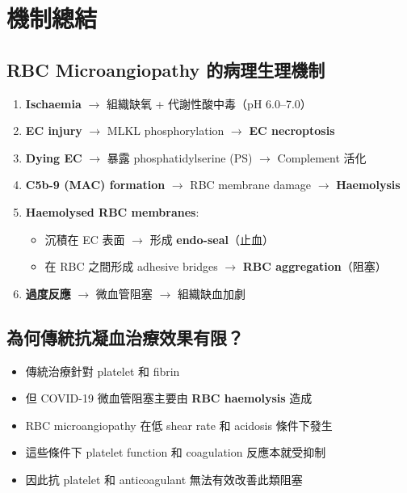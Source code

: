 \documentclass[12pt,a4paper]{article}
\begin{document}

\section{機制總結}

\subsection{RBC Microangiopathy 的病理生理機制}

\begin{enumerate}
    \item \textbf{Ischaemia} $\rightarrow$ 組織缺氧 + 代謝性酸中毒（pH 6.0--7.0）
    \item \textbf{EC injury} $\rightarrow$ MLKL phosphorylation $\rightarrow$ \textbf{EC necroptosis}
    \item \textbf{Dying EC} $\rightarrow$ 暴露 phosphatidylserine (PS) $\rightarrow$ Complement 活化
    \item \textbf{C5b-9 (MAC) formation} $\rightarrow$ RBC membrane damage $\rightarrow$ \textbf{Haemolysis}
    \item \textbf{Haemolysed RBC membranes}:
    \begin{itemize}
        \item 沉積在 EC 表面 $\rightarrow$ 形成 \textbf{endo-seal}（止血）
        \item 在 RBC 之間形成 adhesive bridges $\rightarrow$ \textbf{RBC aggregation}（阻塞）
    \end{itemize}
    \item \textbf{過度反應} $\rightarrow$ 微血管阻塞 $\rightarrow$ 組織缺血加劇
\end{enumerate}

\subsection{為何傳統抗凝血治療效果有限？}

\begin{itemize}
    \item 傳統治療針對 platelet 和 fibrin
    \item 但 COVID-19 微血管阻塞主要由 \textbf{RBC haemolysis} 造成
    \item RBC microangiopathy 在低 shear rate 和 acidosis 條件下發生
    \item 這些條件下 platelet function 和 coagulation 反應本就受抑制
    \item 因此抗 platelet 和 anticoagulant 無法有效改善此類阻塞
\end{itemize}
\end{document}
